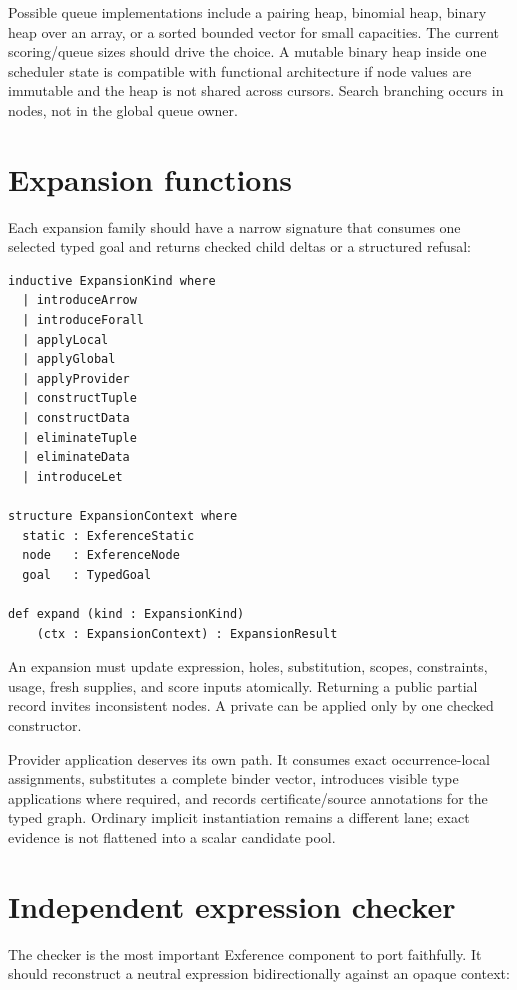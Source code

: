 \documentclass[10pt,letterpaper,oneside]{report}
\newcommand{\code}[1]{\texttt{\detokenize{#1}}}
\begin{document}
Possible queue implementations include a pairing heap, binomial heap, binary heap over an array, or a sorted bounded vector for small capacities. The current scoring/queue sizes should drive the choice. A mutable binary heap inside one scheduler state is compatible with functional architecture if node values are immutable and the heap is not shared across cursors. Search branching occurs in nodes, not in the global queue owner.

\section{Expansion functions}

Each expansion family should have a narrow signature that consumes one selected typed goal and returns checked child deltas or a structured refusal:

\begin{lstlisting}[language=Leanish]
inductive ExpansionKind where
  | introduceArrow
  | introduceForall
  | applyLocal
  | applyGlobal
  | applyProvider
  | constructTuple
  | constructData
  | eliminateTuple
  | eliminateData
  | introduceLet

structure ExpansionContext where
  static : ExferenceStatic
  node   : ExferenceNode
  goal   : TypedGoal

def expand (kind : ExpansionKind)
    (ctx : ExpansionContext) : ExpansionResult
\end{lstlisting}

An expansion must update expression, holes, substitution, scopes, constraints, usage, fresh supplies, and score inputs atomically. Returning a public partial record invites inconsistent nodes. A private \code{NodeDelta} can be applied only by one checked constructor.

Provider application deserves its own path. It consumes exact occurrence-local assignments, substitutes a complete binder vector, introduces visible type applications where required, and records certificate/source annotations for the typed graph. Ordinary implicit instantiation remains a different lane; exact evidence is not flattened into a scalar candidate pool.

\section{Independent expression checker}

The checker is the most important Exference component to port faithfully. It should reconstruct a neutral expression bidirectionally against an opaque context:
\end{document}
